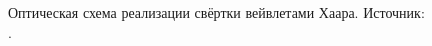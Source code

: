 \begin{figure}[h]
	\caption{Оптическая схема реализации свёртки вейвлетами Хаара. Источник: \cite{alkholidi2008real}.}
	\label{ris:JPEG2000}
\end{figure}
